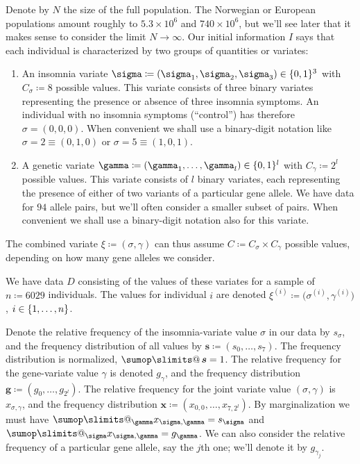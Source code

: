 \documentclass[\ifafour a4paper,12pt,\else a5paper,10pt,\fi%
onecolumn,oneside,article,%
british%
]{memoir}
\makeatletter
\theoremstyle{remark}
\theoremstyle{innote}
\def\sum{\DOTSI\sumop\slimits@}
\newcommand*{\defd}{\coloneqq}
\DeclarePairedDelimiter\set{\{}{\}}
\renewcommand*{\|}{\mathpunct{|}}
\newcommand*{\tsum}{\mathop{\textstyle\sum}\nolimits}
\newcommand*{\yD}{D}
\newcommand*{\yI}{I}
\newcommand*{\ysum}{\tsum}
\newcommand*{\ys}{\sigma}
\newcommand*{\yg}{\gamma}
\newcommand*{\gn}{l}
\newcommand*{\ysi}[1]{\ys^{(#1)}}
\newcommand*{\ygi}[1]{\yg^{(#1)}}
\newcommand*{\yfs}{\bm{s}}
\newcommand*{\yfg}{\bm{g}}
\newcommand*{\yv}{\xi}
\newcommand*{\yvi}[1]{\yv^{(#1)}}
\newcommand*{\yf}{\bm{x}}
\newcommand*{\yCs}{C_{\sigma}}
\newcommand*{\yCg}{C_{\gamma}}
\makeatother
\begin{document}
Denote by $N$ the size of the full population. The Norwegian or European
populations amount roughly to $5.3 \times 10^6$ and $740 \times 10^6$, but
we'll see later that it makes sense to consider the limit $N\to\infty$. Our
initial information $\yI$ says that each individual is characterized by two
groups of quantities or variates:
\begin{enumerate}
\item An insomnia variate $\ys \defd (\ys_1,\ys_2,\ys_3)\in \set{0,1}^3$
  with $\yCs\defd 8$ possible values. This variate consists of three
  binary variates representing the presence or absence of three insomnia
  symptoms. An individual with no insomnia symptoms (\enquote{control}) has
  therefore $\ys=(0,0,0)$. When convenient we shall use a binary-digit
  notation like $\ys=2\equiv (0,1,0)$ or $\ys=5\equiv(1,0,1)$.
\item A genetic variate
  $\yg \defd (\yg_1,\dotsc,\yg_{\gn})\in \set{0,1}^{\gn}$ with
  $\yCg \defd 2^{\gn}$ possible values. This variate consists of $\gn$
  binary variates, each representing the presence of either of two variants
  of a particular gene allele. We have data for $94$ allele pairs, but
  we'll often consider a smaller subset of pairs. When convenient we shall
  use a binary-digit notation also for this variate.
\end{enumerate}
The combined variate $\yv \defd (\ys,\yg)$ can thus assume
$C\defd \yCs\times\yCg$ %
possible values, depending on how many gene alleles we consider.

We have data $\yD$ consisting of the values of these variates for a sample
of $n\defd 6029$ individuals. The values for individual $i$ are denoted
$\yvi{i} \defd \bigl( \ysi{i}, \ygi{i} \bigr)$, $i \in \set{1,\dotsc,n}$.

Denote the relative frequency of the insomnia-variate value $\ys$ in our
data by $s_{\ys}$, and the frequency distribution of all values by
$\yfs\defd(s_0,\dotsc,s_7)$. The frequency distribution is normalized,
$\ysum\yfs=1$. The relative frequency for the gene-variate value $\yg$ is
denoted $g_{\yg}$, and the frequency distribution
$\yfg \defd (g_0,\dotsc,g_{2^{\gn}})$. The relative frequency for the joint
variate value $(\ys,\yg)$ is $x_{\ys,\yg}$, and the frequency distribution
$\yf \defd (x_{0,0},\dotsc, x_{7,2^{\gn}})$. By marginalization we must
have $\sum_{\yg} x_{\ys,\yg} = s_{\ys}$ and
$\sum_{\ys} x_{\ys,\yg} = g_{\yg}$. We can also consider the relative
frequency of a particular gene allele, say the $j$th one; we'll denote it
by $g_{\yg_j}$.
\end{document}
